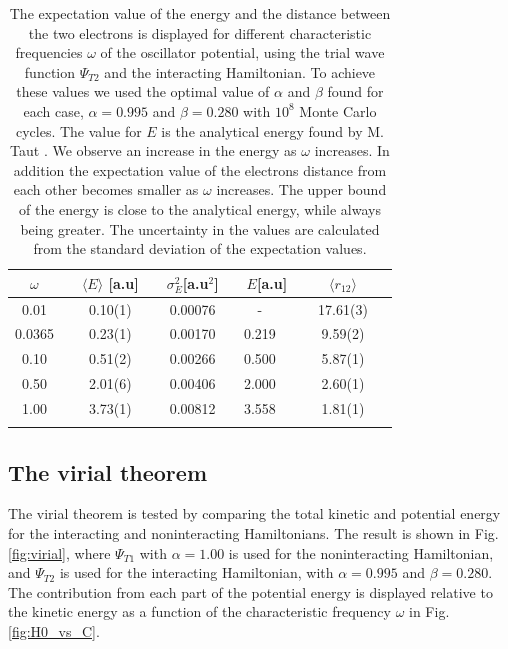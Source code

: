 \documentclass[%
 reprint,
nofootinbib,
aps,
]{revtex4-1}
\begin{document}
\begin{table}[]
    \caption{The expectation value of the energy and the distance between the two electrons is displayed for different characteristic frequencies $\omega$ of the oscillator potential, using the trial wave function $\Psi_{T2}$ and the interacting Hamiltonian. To achieve these values we used the optimal value of $\alpha$ and $\beta$ found for each case, $\alpha=0.995$ and $\beta=0.280$ with $10^{8}$ Monte Carlo cycles. The value for $E$ is the analytical energy found by M. Taut \cite{taut}. We observe an increase in the energy as $\omega$ increases. In addition the expectation value of the electrons distance from each other becomes smaller as $\omega$ increases. The upper bound of the energy is close to the analytical energy, while always being greater. The uncertainty in the values are calculated from the standard deviation of the expectation values.}
  \begin{tabular}{@{}ccccc@{}}
  \toprule
$\quad\omega\quad$ & $\quad\langle E \rangle$ [a.u]$ \quad$ & $\sigma_E^2$[a.u$^2$] & $\quad E$[a.u]
& $\qquad\langle r_{12} \rangle\qquad$ \\ \midrule
  0.01     & 0.10(1)  & 0.00076 &   -      & 17.61(3)     \\
  0.0365   & 0.23(1)  & 0.00170 &  0.219   & 9.59(2)      \\
  0.10     & 0.51(2)  & 0.00266 &  0.500   & 5.87(1)      \\
  0.50     & 2.01(6)  & 0.00406 &  2.000   & 2.60(1)      \\
  1.00     & 3.73(1)  & 0.00812 &  3.558       & 1.81(1)  \\ \botrule
  \end{tabular}
  \label{table:omega_2}
\end{table}

\subsection{The virial theorem}
The virial theorem is tested by comparing the total kinetic and potential energy for the interacting and noninteracting Hamiltonians. The result is shown in Fig. \vref{fig:virial}, where $\Psi_{T1}$ with $\alpha=1.00$ is used for the noninteracting Hamiltonian, and $\Psi_{T2}$ is used for the interacting Hamiltonian, with $\alpha=0.995$ and $\beta=0.280$. The contribution from each part of the potential energy is displayed relative to the kinetic energy as a function of the characteristic frequency $\omega$ in Fig. \vref{fig:H0_vs_C}.
\end{document}
